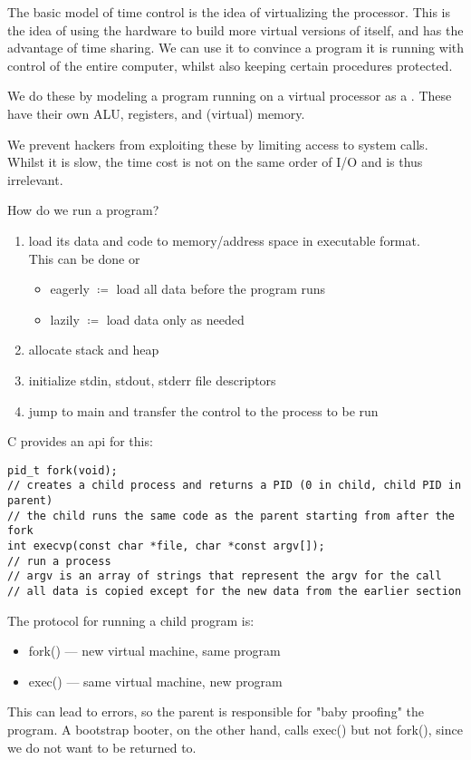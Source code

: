 \documentclass[../../lecture_notes.tex]{subfiles}
\begin{document}
The basic model of time control is the idea of virtualizing the processor. This is the idea of using the hardware to build more virtual versions of itself, and has the advantage of time sharing. We can use it to convince a program it is running with control of the entire computer, whilst also keeping certain procedures protected.

We do these by modeling a program running on a virtual processor as a . These have their own ALU, registers, and (virtual) memory.

We prevent hackers from exploiting these by limiting access to system calls. Whilst it is slow, the time cost is not on the same order of I/O and is thus irrelevant.

How do we run a program?
\begin{enumerate}
\item load its data and code to memory/address space in executable format. \\
	This can be done  or  \begin{itemize}
	\item eagerly $\coloneqq$ load all data before the program runs
	\item lazily $\coloneqq$ load data only as needed
	\end{itemize}
\item allocate stack and heap
\item initialize stdin, stdout, stderr file descriptors
\item jump to main and transfer the control to the process to be run
\end{enumerate}

C provides an api for this:
\begin{lstlisting}
pid_t fork(void);
// creates a child process and returns a PID (0 in child, child PID in parent)
// the child runs the same code as the parent starting from after the fork
int execvp(const char *file, char *const argv[]);
// run a process
// argv is an array of strings that represent the argv for the call
// all data is copied except for the new data from the earlier section
\end{lstlisting}

The protocol for running a child program is: 
\begin{itemize}
\item fork() --- new virtual machine, same program
\item exec() --- same virtual machine, new program
\end{itemize}
This can lead to errors, so the parent is responsible for "baby proofing" the program.  A bootstrap booter, on the other hand, calls exec() but not fork(), since we do not want to be returned to.
\end{document}
